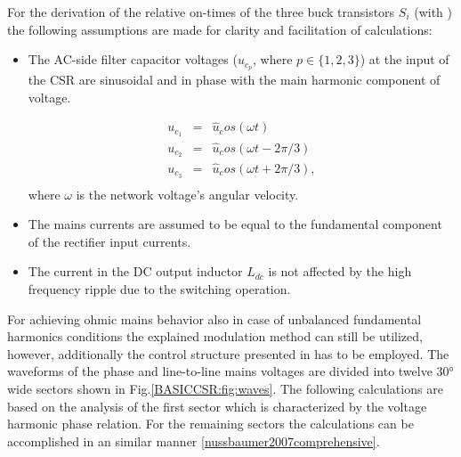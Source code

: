 For the derivation of the relative on-times of the three buck transistors $S_i$ (with ) the following assumptions are made for clarity and facilitation of calculations:
\begin{itemize}
	\item The AC-side filter capacitor voltages ($u_{c_p}$, where $p\in\{1,2,3\}$) at the input of the CSR are sinusoidal and in phase with the main harmonic component of voltage.
	
	\begin{equation}
        \begin{array}{rcl}
            u_{c_1}&=&\widehat{u}_cos(\omega t)\\
						u_{c_2}&=&\widehat{u}_cos(\omega t-2\pi/3)\\
						u_{c_3}&=&\widehat{u}_cos(\omega t+2\pi/3),\\
        \end{array}
        \label{BASICMPC:equ:basic_LTI}
    \end{equation}
	where $\omega$ is the network voltage's angular velocity.
	
	\item The mains currents are assumed to be equal to the fundamental component of the rectifier input currents.
	\item The current in the DC output inductor $L_{dc}$ is not affected by the high frequency ripple due to the switching operation.
\end{itemize}

 For achieving ohmic mains behavior also in case of unbalanced fundamental harmonics conditions the explained modulation method can still be utilized, however, additionally the control structure presented in \cite{baumann2005novel} has to be employed. The
waveforms of the phase and line-to-line mains voltages are divided into twelve $30°$wide sectors shown in Fig.\ref{BASICCSR:fig:waves}. The following calculations are based on the analysis of the first sector which is characterized by the voltage harmonic phase relation. For the remaining sectors the calculations can be accomplished in an similar manner \ref{nussbaumer2007comprehensive}.

